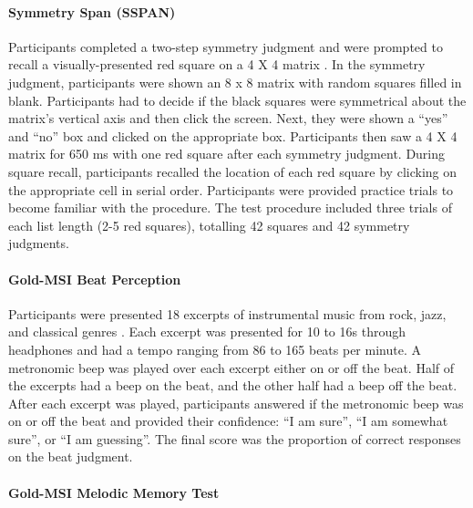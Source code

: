\documentclass[]{book}
\let\oldparagraph\paragraph
\renewcommand{\paragraph}[1]{\oldparagraph{#1}\mbox{}}
\begin{document}
\hypertarget{symmetry-span-sspan}{%
\paragraph{Symmetry Span (SSPAN)}\label{symmetry-span-sspan}}

Participants completed a two-step symmetry judgment and were prompted to recall a visually-presented red square on a 4 X 4 matrix \citep{unsworthAutomatedVersionOperation2005}.
In the symmetry judgment, participants were shown an 8 x 8 matrix with random squares filled in blank.
Participants had to decide if the black squares were symmetrical about the matrix's vertical axis and then click the screen.
Next, they were shown a ``yes'' and ``no'' box and clicked on the appropriate box.
Participants then saw a 4 X 4 matrix for 650 ms with one red square after each symmetry judgment.
During square recall, participants recalled the location of each red square by clicking on the appropriate cell in serial order.
Participants were provided practice trials to become familiar with the procedure.
The test procedure included three trials of each list length (2-5 red squares), totalling 42 squares and 42 symmetry judgments.

\hypertarget{gold-msi-beat-perception}{%
\paragraph{Gold-MSI Beat Perception}\label{gold-msi-beat-perception}}

Participants were presented 18 excerpts of instrumental music from rock, jazz, and classical genres \citep{mullensiefenMusicalityNonMusiciansIndex2014}.
Each excerpt was presented for 10 to 16s through headphones and had a tempo ranging from 86 to 165 beats per
minute.
A metronomic beep was played over each excerpt either on or off the beat.
Half of the excerpts had a beep on the beat, and the other half had a beep off the beat.
After each excerpt was played, participants answered if the metronomic beep was on or off the beat and provided their confidence: ``I am sure'', ``I am somewhat sure'', or ``I am guessing''.
The final score was the proportion of correct responses on the beat judgment.

\hypertarget{gold-msi-melodic-memory-test}{%
\paragraph{Gold-MSI Melodic Memory Test}\label{gold-msi-melodic-memory-test}}
\end{document}
